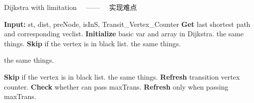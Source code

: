 \begin{algorithm}
    \caption{Dijkstra with limitation \ \ —— \ \ 实现难点}
    \begin{algorithmic}[1]
    \State \textbf{Input:} st, dist, preNode, isInS, Transit\_Vertex\_Counter
    \State \textbf{Get} last shortest path and corresponding veclist. 
    \State \textbf{Initialize} basic var and array in Dijkstra.
            \State the same things.
            \State \textbf{Skip} if the vertex is in black list.
            \State the same things.
        \EndFor

        \State the same things.

            \State \textbf{Skip} if the vertex is in black list.
            \State the same things.
            \State \textbf{Refresh} transition vertex counter.
            \State \textbf{Check} whether can pass maxTrans.
            \State \textbf{Refresh} only when passing maxTrans.
        \EndFor
    \EndWhile
    \end{algorithmic}
\end{algorithm}